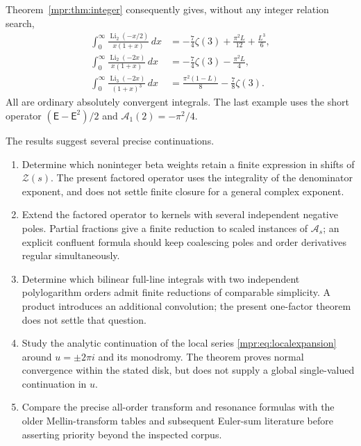 \documentclass[11pt,letterpaper]{article}
\numberwithin{equation}{section}
\theoremstyle{definition}
\theoremstyle{remark}
\begin{document}
Theorem~\ref{mpr:thm:integer} consequently gives, without any integer
relation search,
\begin{align}
 \int_0^\infty\frac{\operatorname{Li}_2(-x/2)}{x(1+x)}\,dx
       &=-\frac74\zeta(3)+\frac{\pi^2L}{12}+\frac{L^3}{6},
             \label{mpr:eq:ex1}\\
 \int_0^\infty\frac{\operatorname{Li}_2(-2x)}{x(1+x)}\,dx
       &=-\frac74\zeta(3)-\frac{\pi^2L}{4},
             \label{mpr:eq:ex2}\\
 \int_0^\infty\frac{\operatorname{Li}_3(-2x)}{(1+x)^3}\,dx
       &=\frac{\pi^2(1-L)}8-\frac78\zeta(3).
             \label{mpr:eq:ex3}
\end{align}
All are ordinary absolutely convergent integrals.  The last example
uses the short operator $(\mathsf E-\mathsf E^2)/2$ and
$\mathcal A_1(2)=-\pi^2/4$.

The results suggest several precise continuations.
\begin{enumerate}
\item Determine which noninteger beta weights retain a finite expression
in shifts of $\mathscr Z(s)$.  The present factored operator uses the
integrality of the denominator exponent, and does not settle finite
closure for a general complex exponent.
\item Extend the factored operator to kernels with several independent
negative poles.  Partial fractions give a finite reduction to scaled
instances of $\mathcal A_s$; an explicit confluent formula should keep
coalescing poles and order derivatives regular simultaneously.
\item Determine which bilinear full-line integrals with two independent
polylogarithm orders admit finite reductions of comparable simplicity.
A product introduces an additional convolution; the present one-factor
theorem does not settle that question.
\item Study the analytic continuation of the local series
\eqref{mpr:eq:localexpansion} around $u=\pm2\pi i$ and its monodromy.
The theorem proves normal convergence within the stated disk, but does
not supply a global single-valued continuation in $u$.
\item Compare the precise all-order transform and resonance formulas with
the older Mellin-transform tables and subsequent Euler-sum literature
before asserting priority beyond the inspected corpus.
\end{enumerate}



\end{document}
